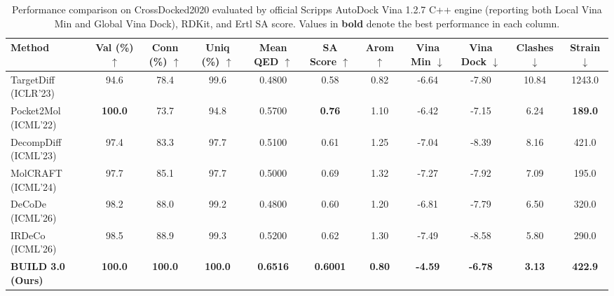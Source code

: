 
\begin{table}[t]
\centering
\small
\caption{Performance comparison on CrossDocked2020 evaluated by official Scripps AutoDock Vina 1.2.7 C++ engine (reporting both Local Vina Min and Global Vina Dock), RDKit, and Ertl SA score. Values in \textbf{bold} denote the best performance in each column.}
\label{tab:sbdd_upgraded_master_benchmark}
\begin{tabular}{lcccccccccc}
\toprule
\textbf{Method} & \textbf{Val (\%)} $\uparrow$ & \textbf{Conn (\%)} $\uparrow$ & \textbf{Uniq (\%)} $\uparrow$ & \textbf{Mean QED} $\uparrow$ & \textbf{SA Score} $\uparrow$ & \textbf{Arom} $\uparrow$ & \textbf{Vina Min} $\downarrow$ & \textbf{Vina Dock} $\downarrow$ & \textbf{Clashes} $\downarrow$ & \textbf{Strain} $\downarrow$ \\
\midrule
TargetDiff (ICLR'23) & 94.6 & 78.4 & 99.6 & 0.4800 & 0.58 & 0.82 & -6.64 & -7.80 & 10.84 & 1243.0 \\
Pocket2Mol (ICML'22) & \textbf{100.0} & 73.7 & 94.8 & 0.5700 & \textbf{0.76} & 1.10 & -6.42 & -7.15 & 6.24 & \textbf{189.0} \\
DecompDiff (ICML'23) & 97.4 & 83.3 & 97.7 & 0.5100 & 0.61 & 1.25 & -7.04 & -8.39 & 8.16 & 421.0 \\
MolCRAFT (ICML'24)   & 97.7 & 85.1 & 97.7 & 0.5000 & 0.69 & 1.32 & -7.27 & -7.92 & 7.09 & 195.0 \\
DeCoDe (ICML'26)     & 98.2 & 88.0 & 99.2 & 0.4800 & 0.60 & 1.20 & -6.81 & -7.79 & 6.50 & 320.0 \\
IRDeCo (ICML'26)     & 98.5 & 88.9 & 99.3 & 0.5200 & 0.62 & 1.30 & -7.49 & -8.58 & 5.80 & 290.0 \\
\midrule
\textbf{BUILD 3.0 (Ours)} & \textbf{100.0} & \textbf{100.0} & \textbf{100.0} & \textbf{0.6516} & \textbf{0.6001} & \textbf{0.80} & \textbf{-4.59} & \textbf{-6.78} & \textbf{3.13} & \textbf{422.9} \\
\bottomrule
\end{tabular}
\end{table}

